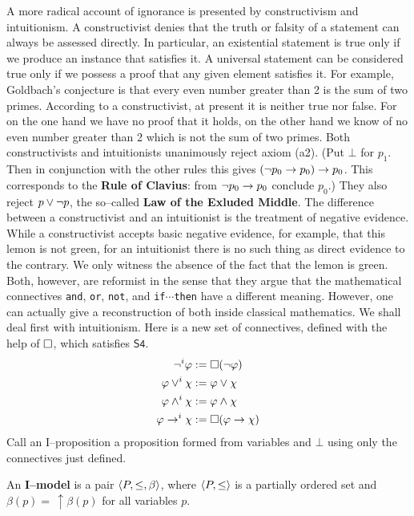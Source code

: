A more radical account of ignorance is presented by constructivism 
and intuitionism. A constructivist denies that the truth or falsity 
of a statement can always be assessed directly. In particular, an 
existential statement is true only if we produce an instance that 
satisfies it. A universal statement can be considered true only if we
possess a proof that any given element satisfies it. For example,
Goldbach's conjecture is that every even number greater than 2 is
the sum of two primes. According to a constructivist, at present
it is neither true nor false. For on the one hand we have no proof
that it holds, on the other hand we know of no even number greater
than 2 which is not the sum of two primes. Both
constructivists and intuitionists unanimously reject axiom (a2).
(Put $\bot$ for $p_1$. Then in conjunction with the other rules 
this gives $(\neg p_0 \rightarrow p_0) \rightarrow p_0$. This corresponds to 
the \textbf{Rule of Clavius}: from $\neg p_0 \rightarrow p_0$ conclude 
$p_0$.) They also reject $p \vee \neg p$, the so--called 
\textbf{Law of the Exluded Middle}. The difference between a 
constructivist and an intuitionist is the treatment of negative 
evidence. While a
constructivist accepts basic negative evidence, for example, that
this lemon is not green, for an intuitionist there is no such
thing as direct evidence to the contrary. We only witness the
absence of the fact that the lemon is green. Both, however, are
reformist in the sense that they argue that the mathematical
connectives {\tt and}, {\tt or}, {\tt not}, and {\tt if$\dotsb$then} 
have a different meaning. However, one can actually give a
reconstruction of both inside classical mathematics. We shall deal
first with intuitionism. Here is a new set of connectives, 
defined with the help of $\square$, which satisfies $\mathsf{S4}$.
\begin{equation}
\begin{split}
\neg^i \varphi & := \square (\neg \varphi) \\
\varphi \vee^i \chi & := \varphi \vee \chi \\
\varphi \wedge^i \chi & := \varphi \wedge \chi \\
\varphi \rightarrow^i \chi & := \square (\varphi \rightarrow \chi)
\end{split}
\end{equation}
Call an I--proposition a proposition formed from variables and
$\bot$ using only the connectives just defined.
\begin{defn}
An \textbf{I--model} is a pair $\langle P, \leq, \beta\rangle$, where
$\langle P, \leq\rangle$ is a partially ordered set and $\beta(p) =
\, \uparrow\!\beta(p)$ for all variables $p$.
\end{defn}
